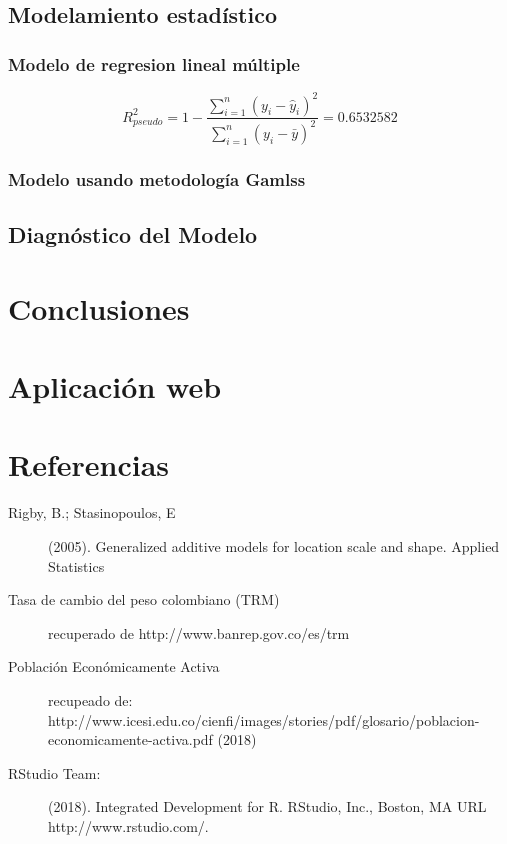 \documentclass[11pt,twoside]{article}
\begin{document}
	
	
	\subsection{Modelamiento estadístico}
	\subsubsection{Modelo de regresion lineal múltiple}
\begin{equation}
	{ R }^{ 2 }_{pseudo}=1-\frac { \sum _{ i=1 }^{ n }{ { ({ y }_{ i }-{ \hat { y }  }_{ i }) }^{ 2 } }  }{ \sum _{ i=1 }^{ n }{ { ({ y }_{ i }-{ \bar { y }  }) }^{ 2 } }  }  = 0.6532582
	\end{equation}
	
	\subsubsection{Modelo usando metodología Gamlss}
	\subsection{Diagnóstico del Modelo}
	\section{Conclusiones}
	
	
	\section{Aplicación web}
	\section{Referencias}
	\begin{description}
		
		
		\item[Rigby, B.; Stasinopoulos, E] (2005).
		Generalized additive
		models for location scale and shape. Applied Statistics
		
		\item[Tasa de cambio del peso colombiano (TRM)]  recuperado de http://www.banrep.gov.co/es/trm
		
		
		\item[Población Económicamente Activa]
		recupeado de:\\
		http://www.icesi.edu.co/cienfi/images/stories/pdf/glosario/poblacion-economicamente-activa.pdf (2018)
		
		
		\item[RStudio Team:] (2018).
		Integrated Development for R. RStudio, Inc., Boston, MA URL http://www.rstudio.com/.  
		
		
	\end{description}
	
\end{document}
